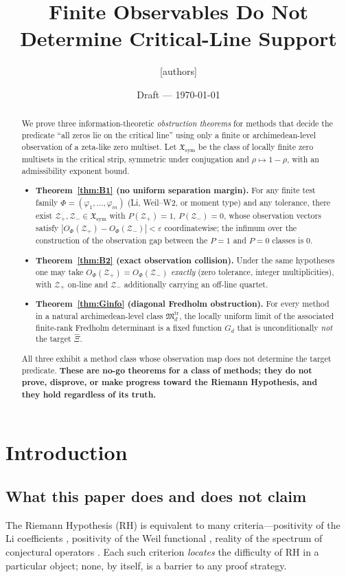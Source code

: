 \documentclass[11pt]{article}
\title{Finite Observables Do Not Determine Critical-Line Support}
\author{[authors]}
\date{Draft --- \today}
\theoremstyle{plain}
\theoremstyle{definition}
\theoremstyle{remark}
\newcommand{\Xsym}{\mathfrak{X}_{\mathrm{sym}}}
\newcommand{\Zp}{\mathcal{Z}_+}
\newcommand{\Zm}{\mathcal{Z}_-}
\newcommand{\Xihat}{\widehat{\Xi}}
\newcommand{\Md}{\mathfrak{M}}
\begin{document}
\maketitle

\begin{abstract}
We prove three information-theoretic \emph{obstruction theorems} for methods that decide the
predicate ``all zeros lie on the critical line'' using only a finite or archimedean-level
observation of a zeta-like zero multiset. Let $\Xsym$ be the class of locally finite zero
multisets in the critical strip, symmetric under conjugation and $\rho\mapsto 1-\rho$, with an
admissibility exponent bound.
\begin{itemize}
  \item \textbf{Theorem~\ref{thm:B1} (no uniform separation margin).} For any finite test
  family $\Phi=(\varphi_1,\dots,\varphi_m)$ (Li, Weil--W2, or moment type) and any tolerance,
  there exist $\Zp,\Zm\in\Xsym$ with $P(\Zp)=1$, $P(\Zm)=0$, whose observation vectors satisfy
  $|O_\Phi(\Zp)-O_\Phi(\Zm)|<\varepsilon$ coordinatewise; the infimum over the construction of
  the observation gap between the $P=1$ and $P=0$ classes is $0$.
  \item \textbf{Theorem~\ref{thm:B2} (exact observation collision).} Under the same hypotheses
  one may take $O_\Phi(\Zp)=O_\Phi(\Zm)$ \emph{exactly} (zero tolerance, integer
  multiplicities), with $\Zp$ on-line and $\Zm$ additionally carrying an off-line quartet.
  \item \textbf{Theorem~\ref{thm:Ginfo} (diagonal Fredholm obstruction).} For every method in a
  natural archimedean-level class $\Md_d^{\mathrm{tr}}$, the locally uniform limit of the
  associated finite-rank Fredholm determinant is a fixed function $G_d$ that is
  unconditionally \emph{not} the target $\Xihat$.
\end{itemize}
All three exhibit a method class whose observation map does not determine the target
predicate. \textbf{These are no-go theorems for a class of methods; they do not prove,
disprove, or make progress toward the Riemann Hypothesis, and they hold regardless of its
truth.}
\end{abstract}

\section{Introduction}

\subsection{What this paper does and does not claim}
The Riemann Hypothesis (RH) is equivalent to many criteria---positivity of the Li coefficients
\cite{Li1997}, positivity of the Weil functional \cite{Weil1952,Bombieri2000}, reality of the
spectrum of conjectural operators \cite{BerryKeating1999,Connes1999}. Each such criterion
\emph{locates} the difficulty of RH in a particular object; none, by itself, is a barrier to
any proof strategy.
\end{document}
